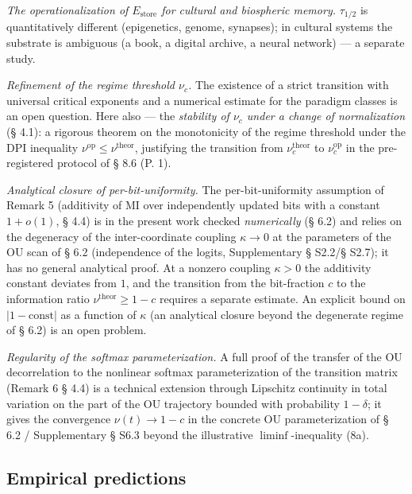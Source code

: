 \documentclass[pdflatex,sn-mathphys-ay]{sn-jnl}
\begin{document}
\emph{The operationalization of \(E_{\text{store}}\) for cultural and biospheric memory.} \(\tau_{1/2}\) is quantitatively different (epigenetics, genome, synapses); in cultural systems the substrate is ambiguous (a book, a digital archive, a neural network) --- a separate study.



\emph{Refinement of the regime threshold \(\nu_c\).} The existence of a strict transition with universal critical exponents and a numerical estimate for the paradigm classes is an open question. Here also --- the \emph{stability of \(\nu_c\) under a change of normalization} (§ 4.1): a rigorous theorem on the monotonicity of the regime threshold under the DPI inequality \(\nu^{\text{op}} \le \nu^{\text{theor}}\), justifying the transition from \(\nu_c^{\text{theor}}\) to \(\nu_c^{\text{op}}\) in the pre-registered protocol of § 8.6 (P. 1).



\emph{Analytical closure of per-bit-uniformity.} The per-bit-uniformity assumption of Remark 5 (additivity of MI over independently updated bits with a constant \(1+o(1)\), § 4.4) is in the present work checked \emph{numerically} (§ 6.2) and relies on the degeneracy of the inter-coordinate coupling \(\kappa \to 0\) at the parameters of the OU scan of § 6.2 (independence of the logits, Supplementary § S2.2/§ S2.7); it has no general analytical proof. At a nonzero coupling \(\kappa > 0\) the additivity constant deviates from \(1\), and the transition from the bit-fraction \(c\) to the information ratio \(\nu^{\text{theor}} \ge 1 - c\) requires a separate estimate. An explicit bound on \(|1 - \text{const}|\) as a function of \(\kappa\) (an analytical closure beyond the degenerate regime of § 6.2) is an open problem.



\emph{Regularity of the softmax parameterization.} A full proof of the transfer of the OU decorrelation to the nonlinear softmax parameterization of the transition matrix (Remark 6 § 4.4) is a technical extension through Lipschitz continuity in total variation on the part of the OU trajectory bounded with probability \(1-\delta\); it gives the convergence \(\nu(t) \to 1 - c\) in the concrete OU parameterization of § 6.2 / Supplementary § S6.3 beyond the illustrative \(\liminf\)-inequality (8a).



\subsection{Empirical predictions}\label{empirical-predictions}
\end{document}
